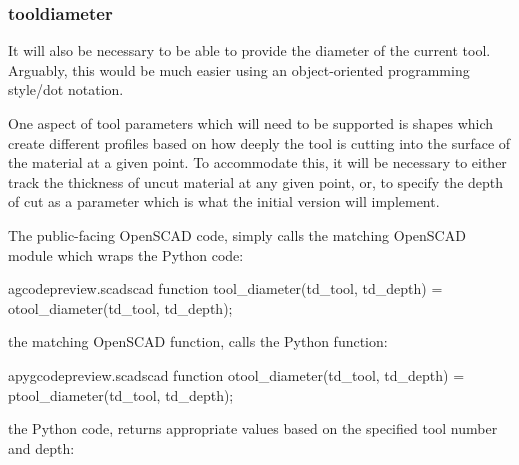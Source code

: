 \documentclass{ltxdoc}
\begin{document}
\subsubsection{tooldiameter}

It will also be necessary to be able to provide the diameter of the current tool.
Arguably, this would be much easier using an object-oriented programming style/dot notation.

One aspect of tool parameters which will need to be supported is shapes which create
different profiles based on how deeply the tool is cutting into the surface of the 
material at a given point. To accommodate this, it will be necessary to either track
the thickness of uncut material at any given point, or, to specify the depth of cut 
as a parameter which is what the initial version will implement.

The public-facing OpenSCAD code, 
simply calls the matching OpenSCAD module which wraps the Python code:
 
\lstset{firstnumber=\thegcpscad}
\begin{writecode}{a}{gcodepreview.scad}{scad}
function tool_diameter(td_tool, td_depth) = otool_diameter(td_tool, td_depth);

\end{writecode}
\addtocounter{gcpscad}{2}

\noindent the matching OpenSCAD function,  
calls the Python function:

\lstset{firstnumber=\thepyscad}
\begin{writecode}{a}{pygcodepreview.scad}{scad}
function otool_diameter(td_tool, td_depth) = ptool_diameter(td_tool, td_depth);

\end{writecode}
\addtocounter{pyscad}{2}
 
\noindent the Python code,  returns 
appropriate values based on the specified tool number and depth:
 
\end{document}
